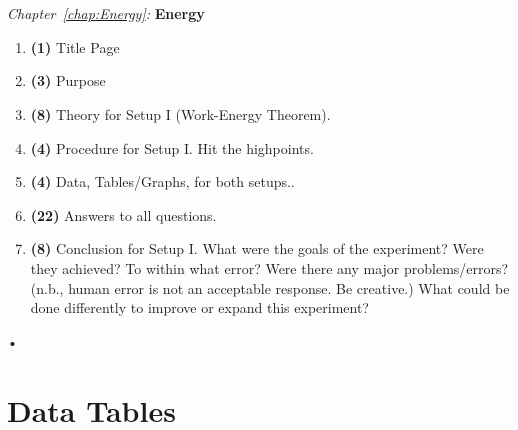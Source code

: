 \documentclass[main.tex]{subfiles}
\begin{document}
\begin{samepage}
\hrulefill\\ \\
\emph{Chapter~\ref{chap:Energy}:} \textbf{Energy}
\begin{enumerate}
\item
\textbf{(1)} Title Page
\item
\textbf{(3)} Purpose
\item
\textbf{(8)} Theory for Setup I (Work-Energy Theorem).
\item
\textbf{(4)} Procedure for Setup I. Hit the highpoints.
\item
\textbf{(4)} Data, Tables/Graphs, for both setups..
\item
\textbf{(22)} Answers to all questions.
\item
\textbf{(8)} Conclusion for Setup I. What were the goals of the experiment? Were they achieved? To within what error? Were there any major problems/errors? (n.b., human error is not an acceptable response. Be creative.) What could be done differently to improve or expand this experiment?
\end{enumerate}•
\end{samepage}

\newpage
\section{Data Tables}
\end{document}
